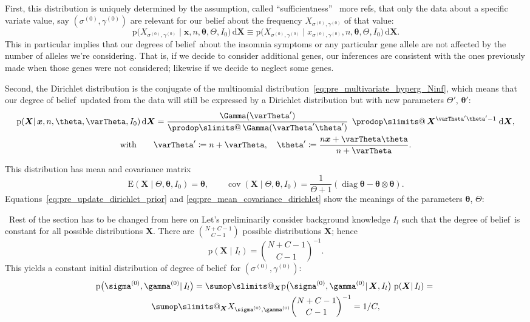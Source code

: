 \documentclass[\ifafour a4paper,12pt,\else a5paper,10pt,\fi%
onecolumn,oneside,article,%
british%
]{memoir}
\makeatletter
\theoremstyle{remark}
\theoremstyle{innote}
\def\sum{\DOTSI\sumop\slimits@}
\def\prod{\DOTSI\prodop\slimits@}
\newcommand*{\citep}{\parencites}
\newcommand*{\di}{\mathrm{d}}%
\newcommand*{\defd}{\coloneqq}
\newcommand*{\pf}{\mathrm{p}}%
\renewcommand*{\|}{\mathpunct{|}}
\newcommand*{\tprod}{\mathop{\textstyle\prod}\nolimits}
\newcommand*{\E}{\mathrm{E}}
\newcommand*{\puzzle}{\maltese}
\newcommand{\mynote}[1]{ {\color{notecolour}\puzzle\ #1}}
\DeclareMathOperator{\cov}{cov}
\DeclareMathOperator{\diag}{diag}
\newcommand*{\dob}{degree of belief}
\newcommand*{\dobs}{degrees of belief}
\newcommand*{\yprod}{\tprod}
\newcommand*{\ys}{\sigma}
\newcommand*{\yg}{\gamma}
\newcommand*{\gn}{l}
\newcommand*{\ysi}[1]{\ys^{(#1)}}
\newcommand*{\ygi}[1]{\yg^{(#1)}}
\newcommand*{\yso}{\ysi{0}}
\newcommand*{\ygo}{\ygi{0}}
\newcommand*{\yF}{\bm{X}}
\newcommand*{\yf}{\bm{x}}
\newcommand*{\yIc}{I_{\gn}}
\newcommand*{\yIo}{I_{0}}
\newcommand*{\yA}{\varTheta}
\newcommand*{\ya}{\bm{\theta}}
\makeatother
\begin{document}
First, this distribution
is uniquely determined by the assumption, called \enquote{sufficientness}
\citep{zabell1982,dinizetal2016}\mynote{more refs}, that only the data
about a specific variate value, say $(\yso, \ygo)$ are relevant for our
belief about the frequency $X_{\yso, \ygo}$ of that value:
\begin{equation}
  \label{eq:pre_sufficientness}
  \pf(X_{\yso, \ygo} \| \yf, n, \ya, \yA,\yIo\bigr)\,\di\yF \equiv
  \pf(X_{\yso, \ygo} \| x_{\yso,\ygo}, n, \ya, \yA,\yIo\bigr)\,\di\yF.
\end{equation}
This in particular implies that our \dobs\ about the insomnia symptoms or
any particular gene allele are not affected by the number of alleles we're
considering. That is, if we decide to consider additional genes, our
inferences are consistent with the ones previously made when those genes
were not considered; likewise if we decide to neglect some genes.

Second, the Dirichlet distribution is the conjugate of the multinomial
distribution~\eqref{eq:pre_multivariate_hyperg_Ninf}, which means that our
\dob\ updated from the data will still be expressed by a Dirichlet
distribution but with new parameters $\yA'$, $\ya'$:
\begin{multline}
  \label{eq:pre_update_dirichlet_prior}
  \pf(\yF \| \yf, n, \ya, \yA,\yIo)\,\di\yF =
  \frac{\Gamma(\yA')}{\yprod\Gamma(\yA'\ya')}\;
  \yprod \yF^{\yA'\ya'-1}\;\di\yF,\\
  \text{with}\qquad
  \yA' \defd n + \yA,
  \quad
  \ya' \defd \frac{n\yf + \yA\ya}{n+\yA}.
\end{multline}

This distribution has mean and covariance matrix
\begin{equation}\label{eq:pre_mean_covariance_dirichlet}
  \E(\yF \| \yA, \ya,\yIo) = \ya, \qquad
  \cov(\yF \| \yA, \ya,\yIo) =
  \frac{1}{\yA+1}(\diag\ya -\ya\otimes\ya).
\end{equation}
Equations~\eqref{eq:pre_update_dirichlet_prior} and
\eqref{eq:pre_mean_covariance_dirichlet} show the meanings of the parameters
$\ya$, $\yA$:




\mynote{Rest of the section has to be changed from here on}
Let's preliminarily consider background
knowledge $\yIc$ such that the \dob\ is constant for all possible
distributions $\yF$. There are $\binom{N+C-1}{C-1}$ possible distributions
$\yF$; hence
\begin{equation}
  \label{eq:pre_constant_prior}
  \pf(\yF \| \yIc) = \binom{N+C-1}{C-1}^{-1}.
\end{equation}
This yields a constant  initial  distribution of \dob\ for $(\yso,\ygo)$:
\begin{multline}
  \label{eq:pre_joint_prob_initial_F_unknown}
  \pf\bigl(\yso, \ygo \| \yIc\bigr)  =
  \sum_{\yF}  \pf\bigl(\yso, \ygo \| \yF,\yIc\bigr) \;
  \pf( \yF \| \yIc) ={}\\
  \sum_{\yF}  X_{\yso, \ygo} \binom{N+C-1}{C-1}^{-1}
  = 1/C,
\end{multline}
\end{document}
